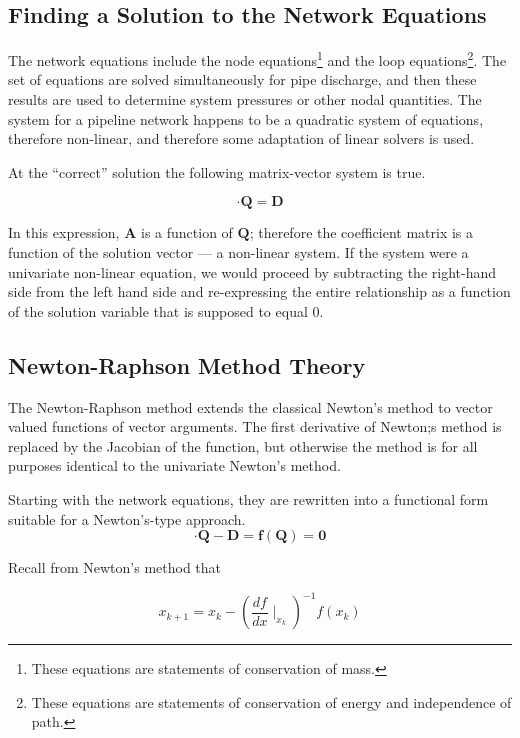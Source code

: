 \subsection{Finding a Solution to the Network Equations}
The network equations include the node equations\footnote{These equations are statements of conservation of mass.} and the loop equations\footnote{These equations are statements of conservation of energy and independence of path.}.  The set of equations are solved simultaneously for pipe discharge, and then these results are used to determine system pressures or other nodal quantities.  The system for a pipeline network happens to be a quadratic system of equations, therefore non-linear, and therefore some adaptation of linear solvers is used.

At the ``correct'' solution the following matrix-vector system is true.

\begin{equation}
[\mathbf{A}(\mathbf{Q})] \cdot \mathbf{Q} = \mathbf{D}
\end{equation}

In this expression, $\mathbf{A}$ is a function of $\mathbf{Q}$; therefore the coefficient matrix is a function of the solution vector --- a non-linear system.  If the system were a univariate non-linear equation, we would proceed by subtracting the right-hand side from the left hand side and re-expressing the entire relationship as a function of the solution variable that is supposed to equal $0$.

\subsection{Newton-Raphson Method Theory}
The Newton-Raphson method extends the classical Newton's method to vector valued functions of vector arguments.  The first derivative of Newton;s method is replaced by the Jacobian of the function, but otherwise the method is for all purposes identical to the univariate Newton's method.

Starting with the network equations, they are rewritten into a functional form suitable for a Newton's-type approach.
\begin{equation}
[\mathbf{A}(\mathbf{Q})] \cdot \mathbf{Q} - \mathbf{D} = \mathbf{f}(\mathbf{Q}) = \mathbf{0}
\end{equation}

Recall from Newton's method that

\begin{equation}
x_{k+1}=x_{k} - (\frac{df}{dx}\mid_{x_k})^{-1} f(x_k)
\end{equation}

